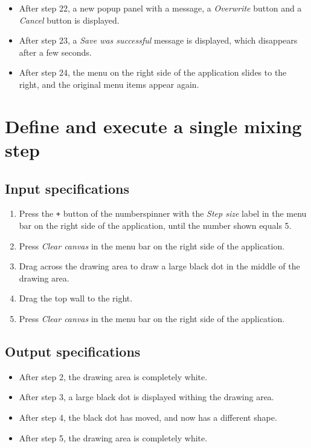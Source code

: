 \begin{itemize}
\item After step 22, a new popup panel with a message, a \emph{Overwrite} button and a \emph{Cancel} button is displayed.
\item After step 23, a \emph{Save was successful} message is displayed, which disappears after a few seconds.
\item After step 24, the menu on the right side of the application slides to the right, and the original menu items appear again.
\end{itemize}

\section{Define and execute a single mixing step}

\subsection*{Input specifications}
\begin{enumerate}
\item Press the \texttt{+} button of the numberspinner with the \emph{Step size} label in the menu bar on the right side of the application, until the number shown equals 5.
\item Press \emph{Clear canvas} in the menu bar on the right side of the application. 
\item Drag across the drawing area to draw a large black dot in the middle of the drawing area.
\item Drag the top wall to the right.
\item Press \emph{Clear canvas} in the menu bar on the right side of the application. 
\end{enumerate}

\subsection*{Output specifications}
\begin{itemize}
\item After step 2, the drawing area is completely white.
\item After step 3, a large black dot is displayed withing the drawing area.
\item After step 4, the black dot has moved, and now has a different shape.
\item After step 5, the drawing area is completely white.
\end{itemize}

